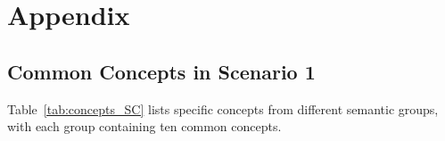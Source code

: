 




\appendix

\section{Appendix}
\label{sec:appendix}

\subsection{Common Concepts in Scenario 1}
\label{sec:sce_1}
Table~\ref{tab:concepts_SC} lists specific concepts from different semantic groups, with each group containing ten common concepts.

